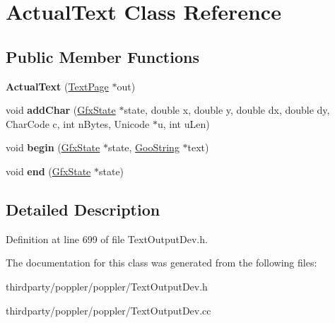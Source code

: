 \hypertarget{class_actual_text}{}\section{Actual\+Text Class Reference}
\label{class_actual_text}
\subsection*{Public Member Functions}
\begin{DoxyCompactItemize}
\item 
\mbox{\label{class_actual_text_a06dee495afd562a70fdea17c2904955f}} 
{\bfseries Actual\+Text} (\hyperlink{class_text_page}{Text\+Page} $\ast$out)
\item 
\mbox{\label{class_actual_text_a10792dec6f9421aade3692f6c7aef543}} 
void {\bfseries add\+Char} (\hyperlink{class_gfx_state}{Gfx\+State} $\ast$state, double x, double y, double dx, double dy, Char\+Code c, int n\+Bytes, Unicode $\ast$u, int u\+Len)
\item 
\mbox{\label{class_actual_text_ad0cfb997141707ab095028ed7f0d6413}} 
void {\bfseries begin} (\hyperlink{class_gfx_state}{Gfx\+State} $\ast$state, \hyperlink{class_goo_string}{Goo\+String} $\ast$text)
\item 
\mbox{\label{class_actual_text_a0e3010f3345b6641b1a271f61585003d}} 
void {\bfseries end} (\hyperlink{class_gfx_state}{Gfx\+State} $\ast$state)
\end{DoxyCompactItemize}


\subsection{Detailed Description}


Definition at line 699 of file Text\+Output\+Dev.\+h.



The documentation for this class was generated from the following files\+:\begin{DoxyCompactItemize}
\item 
thirdparty/poppler/poppler/Text\+Output\+Dev.\+h\item 
thirdparty/poppler/poppler/Text\+Output\+Dev.\+cc\end{DoxyCompactItemize}
